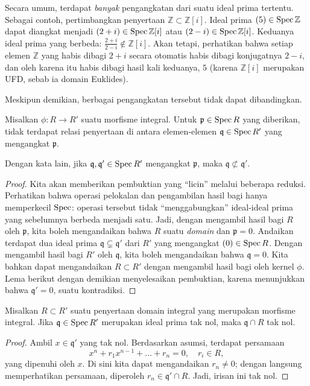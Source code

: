 Secara umum, terdapat \emph{banyak} pengangkatan dari suatu ideal prima tertentu.
Sebagai contoh, pertimbangkan penyertaan $\mathbb{Z} \subset \mathbb{Z}[i]$.
Ideal prima $(5) \in \operatorname{Spec} \mathbb{Z}$ dapat diangkat menjadi $(2+i)
\in \operatorname{Spec} \mathbb{Z}[i]$
atau $(2-i) \in \operatorname{Spec} \mathbb{Z}[i]$.
Keduanya ideal prima yang berbeda: $\frac{2+i}{2-i} \notin \mathbb{Z}[i]$. Akan tetapi,
perhatikan bahwa setiap elemen $\mathbb{Z}$ yang habis dibagi $2+i$ secara otomatis
habis dibagi konjugatnya $2-i$, dan oleh karena itu habis dibagi hasil kali keduanya, $5$
(karena $\mathbb{Z}[i]$ merupakan UFD, sebab ia domain Euklides).

Meskipun demikian, berbagai pengangkatan tersebut tidak dapat dibandingkan.

\begin{proposition} \label{incomparableintegral}
Misalkan $\phi: R \to R'$ suatu morfisme integral. Untuk $\mathfrak{p} \in
\operatorname{Spec} R$ yang diberikan, tidak terdapat relasi penyertaan di antara elemen-elemen $\mathfrak{q} \in \operatorname{Spec}
R'$ yang mengangkat $\mathfrak{p}$.
\end{proposition} 
Dengan kata lain, jika $\mathfrak{q}, \mathfrak{q}' \in \operatorname{Spec} R'$ mengangkat
$\mathfrak{p}$, maka $\mathfrak{q} \not\subset \mathfrak{q}'$.
\begin{proof} 
Kita akan memberikan pembuktian yang “licin” melalui beberapa reduksi.
Perhatikan bahwa operasi pelokalan dan pengambilan hasil bagi hanya memperkecil
$\operatorname{Spec}$: operasi tersebut tidak “menggabungkan” ideal-ideal prima yang sebelumnya berbeda menjadi satu.
Jadi, dengan mengambil hasil bagi $R$ oleh $\mathfrak{p}$, kita boleh mengandaikan bahwa $R$ suatu
\emph{domain} dan $\mathfrak{p} = 0$.
Andaikan terdapat dua ideal prima $\mathfrak{q} \subsetneq \mathfrak{q}'$ dari $R'$
yang mengangkat $(0) \in \operatorname{Spec} R$.
Dengan mengambil hasil bagi $R'$ oleh $\mathfrak{q}$, kita boleh mengandaikan bahwa $\mathfrak{q}  = 0$.
Kita bahkan dapat mengandaikan $R \subset R'$ dengan mengambil hasil bagi oleh kernel $\phi$.
Lema berikut dengan demikian menyelesaikan pembuktian, karena menunjukkan bahwa $\mathfrak{q}'
= 0$, suatu kontradiksi.
\end{proof} 

\begin{lemma} 
Misalkan $R \subset R'$ suatu penyertaan domain integral yang merupakan morfisme
integral. Jika $\mathfrak{q} \in \operatorname{Spec} R'$ merupakan ideal prima tak nol, maka
$\mathfrak{q} \cap R$ tak nol.
\end{lemma} 
\begin{proof} 
Ambil $x \in \mathfrak{q}'$ yang tak nol. Berdasarkan asumsi, terdapat persamaan
\[ x^n + r_1 x^{n-1} + \dots + r_n = 0,  \quad r_i \in R, \]
yang dipenuhi oleh $x$. 
Di sini kita dapat mengandaikan $r_n \neq 0$; dengan langsung memperhatikan persamaan, diperoleh $r_n \in \mathfrak{q}' \cap R$.
Jadi, irisan ini tak nol.

\end{proof} 


